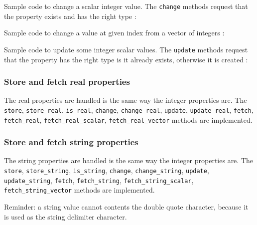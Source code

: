 \pn Sample code to change a scalar integer value. The \texttt{change} methods
request that the property exists and has the right type :
\pn
{}

\pn Sample code to change a value at given index from a vector of integers :
\pn
{}

\pn Sample code to update some integer scalar values. The \texttt{update} 
methods request that the property has the right type is it already exists,
otherwise it is created :
\pn
{}

\subsubsection{Store and fetch real properties}

The real properties are handled  is the same way the integer properties
are.   The  \texttt{store},  \texttt{store\_real},  \texttt{is\_real},
\texttt{change},        \texttt{change\_real},        \texttt{update},
\texttt{update\_real},  \texttt{fetch},  \texttt{fetch\_real},
\texttt{fetch\_real\_scalar},
\texttt{fetch\_real\_vector}  methods
are implemented.

\subsubsection{Store and fetch string properties}


The  string  properties  are  handled  is the  same  way  the  integer
properties    are.    The    \texttt{store},   \texttt{store\_string},
\texttt{is\_string},     \texttt{change},     \texttt{change\_string},
\texttt{update},        \texttt{update\_string},       \texttt{fetch},
\texttt{fetch\_string},
\texttt{fetch\_string\_scalar},
\texttt{fetch\_string\_vector} methods are implemented.

\pn  Reminder:  a  string  value  cannot  contents  the  double  quote
character, because it is used as the string delimiter character.

